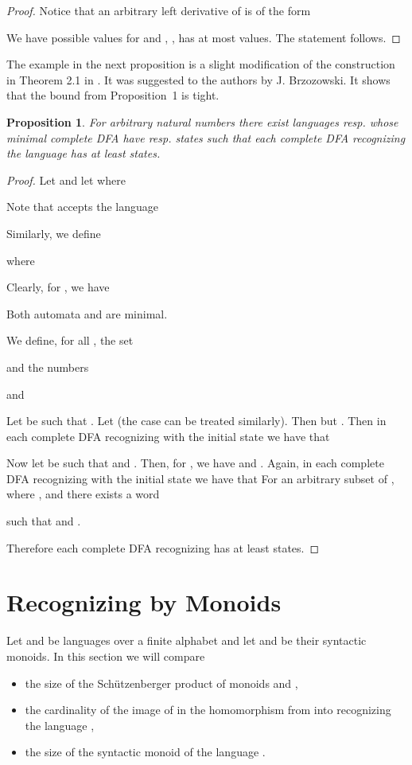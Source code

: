 \documentclass[copyright]{eptcs}
\newcounter{theorem}
\newtheorem{proposition}[theorem]{Proposition}
\theoremstyle{definition}
\begin{document}
\begin{proof}\label{prop-aut}
Notice that an arbitrary left derivative of  is of the form

We have  possible values for  and 
, ,
has at most  values.
The statement follows.
\end{proof}

The example in the next proposition is a slight modification of the construction 
in Theorem 2.1
in \cite{yzs}. It was suggested to the authors by J. Brzozowski. It shows
that the bound from Proposition~1 is tight. 

\begin{proposition}
For arbitrary natural numbers  there exist languages  resp. 
whose
minimal complete DFA have  resp.  states such that each complete
DFA recognizing the language  has at least  states.
\end{proposition}

\begin{proof}
 Let  and
let  
where

Note that  accepts the language

Similarly, we define 

where

Clearly, for , we have

Both automata  and  are minimal.
\smallskip

We define, for all , the set

and the numbers

and

Let  be such that . 
Let  (the case  can be treated similarly).
Then  but . Then in each
complete DFA recognizing  with the initial state  we have
that


Now let  be such that  and
. Then, for ,
we have
 and .
Again, in each
complete DFA recognizing  with the initial state  we have
that 
For an arbitrary subset  of ,
where , and  there exists a word

such that  and .

Therefore each
complete DFA recognizing  has at least  states.
\end{proof}

\section{Recognizing by Monoids} 

Let  and  be languages over a finite alphabet  and let
 and  be their syntactic monoids.
In this section we will compare 
\begin{itemize}
\item 
the size of the Sch\"utzenberger product 
of monoids  and ,
\item
the cardinality of the image of  in the homomorphism 
from   
into   recognizing the language ,
\item
the size of the syntactic monoid of the language .
\end{itemize}
\end{document}

